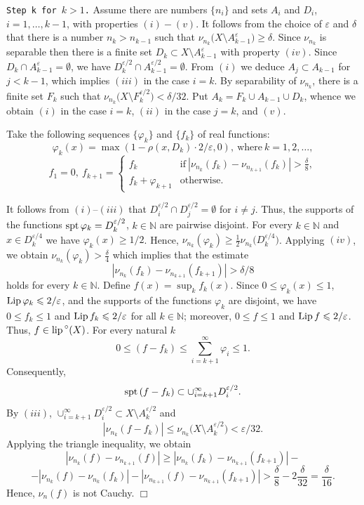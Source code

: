 \documentclass[11pt,a4paper]{article}
\begin{document}
{\tt Step k for $k>1$.}
Assume there are numbers
$\{n_i\}$ and sets $A_i$ and $D_i$, $i=1,\ldots,k-1$,
with properties $(i)-(v)$.
It follows from the choice of $\varepsilon$ and $\delta$
that there is a number $n_k>n_{k-1}$ such that
$\nu_{n_k} \bigl( X\setminus A_{k-1}^{\varepsilon} \bigr) \ge \delta$.
Since $\nu_{n_k}$ is separable then there is a
finite set
$D_k\subset X\setminus A_{k-1}^{\varepsilon}$
with property $(iv)$. Since
$D_k\cap A_{k-1}^{\varepsilon}=\emptyset$, we have
$D_k^{\varepsilon/2}\cap A_{k-1}^{\varepsilon/2}=\emptyset$.
From $(i)$ we deduce $A_j\subset A_{k-1}$ for $j<k-1$, which
implies $(iii)$ in the case $i=k$.
By separability of $\nu_{n_k}$, there is a finite set $F_k$ such that
$\nu_{n_k} \bigl( X\setminus F_k^{\varepsilon/2} \bigr) < \delta/32$.
Put $A_k=F_k\cup A_{k-1}\cup D_k$, whence we obtain
$(i)$ in the case $i=k$, $(ii)$ in the case $j=k$, and $(v)$.

Take the following sequences $\{\varphi_k\}$ and $\{f_k\}$ of real functions:
$$\varphi_k(x) = \max(1-\rho(x, D_k) \cdot 2 / \varepsilon, 0), ~\mbox{where}~k=1,2,\ldots,$$
$$f_1=0,~f_{k+1}=
  \left\{
  \begin{array}{ll} %
   f_k & \mbox{if}~|\nu_{n_k}(f_k)-\nu_{n_{k+1}}(f_k)|>\frac{\delta}{8}, \\
   f_k+\varphi_{k+1} & \mbox{otherwise}.
  \end{array}
  \right.$$

It follows from $(i)$--$(iii)$ that
$D_i^{\varepsilon/2}\cap D_j^{\varepsilon/2}=\emptyset$ for $i\ne j$.
Thus, the supports of the functions
${\rm spt\,}\varphi_k=D_k^{\varepsilon/2}$, $k\in \mathbb{N}$
are pairwise disjoint.
For every $k\in\mathbb{N}$ and $x\in D_k^{\varepsilon/4}$ we have
$\varphi_k(x)\ge 1/2$. Hence,
$\nu_{n_k}(\varphi_k) \ge \frac{1}{2} \nu_{n_k} \bigl( D_k^{\varepsilon/4} \bigr)$.
Applying $(iv)$, we obtain $\nu_{n_k}(\varphi_k)>\frac{\delta}{4}$
which implies that the estimate
$$|\nu_{n_k}(f_k)-\nu_{n_{k+1}}(f_{k+1})|>\delta/8$$
holds for every $k\in\mathbb{N}$.
Define $f(x)=\sup_k f_k(x)$.
Since $0\le\varphi_k(x)\le 1$, ${\rm Lip\,} \varphi_k \leqslant 2/\varepsilon$,
and the supports of the functions $\varphi_k$ are disjoint, we have
$0\le f_k\le 1$ and ${\rm Lip\,} f_k \leqslant 2/\varepsilon$ for all $k\in\mathbb{N}$;
moreover, $0\le f\le 1$ and ${\rm Lip\,} f\leqslant 2/\varepsilon$.
Thus, $f\in{\rm lip\,}^{\circ}(X)$.
For every natural $k$
$$0\le (f-f_k)\le \sum_{i=k+1}^{\infty}\varphi_i \le 1.$$
Consequently,
$${\rm spt\,} (f-f_k)\subset \cup_{i=k+1}^{\infty} D_i^{\varepsilon/2}.$$
By $(iii)$,
$\cup_{i=k+1}^{\infty} D_i^{\varepsilon/2}\subset X\setminus A_k^{\varepsilon/2}$
and
$$|\nu_{n_k}(f-f_k)|\le \nu_{n_k} \bigl( X\setminus A_k^{\varepsilon/2} \bigr) < \varepsilon/32.$$
Applying the triangle inequality, we obtain
$$|\nu_{n_k}(f)-\nu_{n_{k+1}}(f)| \ge |\nu_{n_k}(f_k)-\nu_{n_{k+1}}(f_{k+1})| - $$
$$ - |\nu_{n_k}(f)-\nu_{n_k}(f_k)|-|\nu_{n_{k+1}}(f)-\nu_{n_{k+1}}(f_{k+1})| >
\frac{\delta}{8}-2\frac{\delta}{32}=\frac{\delta}{16}.$$
Hence, $\nu_n(f)$ is not Cauchy.
\hbox{$\Box$}
\end{document}
